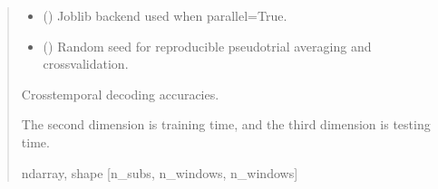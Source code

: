 \documentclass[letterpaper,10pt,english]{sphinxhowto}
\begin{document}
\begin{fulllineitems}
\begin{quote}
\begin{description}
\begin{itemize}
\item {} 
\sphinxAtStartPar
{} (\sphinxstyleliteralemphasis{\sphinxupquote{, }}\sphinxstyleliteralemphasis{\sphinxupquote{, }}) \textendash{} Joblib backend used when parallel=True.

\item {} 
\sphinxAtStartPar
{} (\sphinxstyleliteralemphasis{\sphinxupquote{, }}) \textendash{} Random seed for reproducible pseudo\sphinxhyphen{}trial averaging and cross\sphinxhyphen{}validation.

\end{itemize}

\sphinxAtStartPar

\sphinxAtStartPar
{} \textendash{} Cross\sphinxhyphen{}temporal decoding accuracies.

\sphinxAtStartPar
The second dimension is training time, and the third dimension is
testing time.


\sphinxAtStartPar
ndarray, shape {[}n\_subs, n\_windows, n\_windows{]}

\end{description}\end{quote}

\end{fulllineitems}

\end{document}
